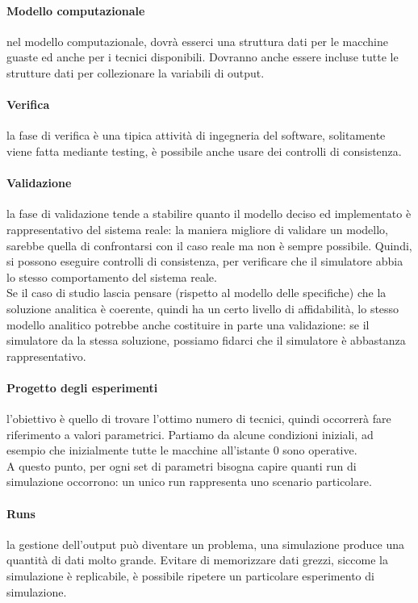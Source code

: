 \documentclass{article}
\begin{document}
\paragraph{Modello computazionale}nel modello computazionale, dovrà esserci una struttura dati per le macchine guaste ed anche per i tecnici disponibili. Dovranno anche essere incluse tutte le strutture dati per collezionare la variabili di output.
\paragraph{Verifica}la fase di verifica è una tipica attività di ingegneria del software, solitamente viene fatta mediante testing, è possibile anche usare dei controlli di consistenza.
\paragraph{Validazione}la fase di validazione tende a stabilire quanto il modello deciso ed implementato è rappresentativo del sistema reale: la maniera migliore di validare un modello, sarebbe quella di confrontarsi con il caso reale ma non è sempre possibile. Quindi, si possono eseguire controlli di consistenza, per verificare che il simulatore abbia lo stesso comportamento del sistema reale.\\ Se il caso di studio lascia pensare (rispetto al modello delle specifiche) che la soluzione analitica è coerente, quindi ha un certo livello di affidabilità, lo stesso modello analitico potrebbe anche costituire in parte una validazione: se il simulatore da la stessa soluzione, possiamo fidarci che il simulatore è abbastanza rappresentativo.
\paragraph{Progetto degli esperimenti}l'obiettivo è quello di trovare l'ottimo numero di tecnici, quindi occorrerà fare riferimento a valori parametrici. Partiamo da alcune condizioni iniziali, ad esempio che inizialmente tutte le macchine all'istante 0 sono operative.\\ A questo punto, per ogni set di parametri bisogna capire quanti run di simulazione occorrono: un unico run rappresenta uno scenario particolare.\\
\paragraph{Runs}la gestione dell'output può diventare un problema, una simulazione produce una quantità di dati molto grande. Evitare di memorizzare dati grezzi, siccome la simulazione è replicabile, è possibile ripetere un particolare esperimento di simulazione.
\end{document}
